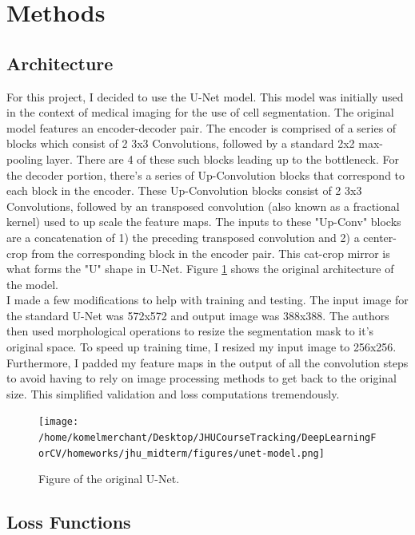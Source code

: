 \documentclass[Location Location Location! : Exploring Image Segmentation Problem In Urban Driving Scenarios]{IEEEtran}
\begin{document}
\section{Methods}

\subsection{Architecture}

For this project, I decided to use the U-Net model. This model was initially used in the context of medical imaging for the use of cell segmentation. The original model features an encoder-decoder pair. The encoder is comprised of a series of blocks which consist of 2 3x3 Convolutions, followed by a standard 2x2 max-pooling layer. There are 4 of these such blocks leading up to the bottleneck. For the decoder portion, there's a series of Up-Convolution blocks that correspond to each block in the encoder. These Up-Convolution blocks consist of 2 3x3 Convolutions, followed by an transposed convolution (also known as a fractional kernel) used to up scale the feature maps. The inputs to these "Up-Conv" blocks are a concatenation of 1) the preceding transposed convolution and 2) a center-crop from the corresponding block in the encoder pair. This cat-crop mirror is what forms the "U" shape in U-Net. Figure \ref{unet} shows the original architecture of the model. 
\\

I made a few modifications to help with training and testing. The input image for the standard U-Net was 572x572 and output image was 388x388. The authors then used morphological operations to resize the segmentation mask to it's original space. To speed up training time, I resized my input image to 256x256. Furthermore, I padded my feature maps in the output of all the convolution steps to avoid having to rely on image processing methods to get back to the original size. This simplified validation and loss computations tremendously.


\begin{figure}[htbp]
\centerline{\texttt{[image: /home/komelmerchant/Desktop/JHUCourseTracking/DeepLearningForCV/homeworks/jhu\_midterm/figures/unet-model.png]}}
\caption{Figure of the original U-Net.}
\label{unet}
\end{figure}


\subsection{Loss Functions}
\end{document}
